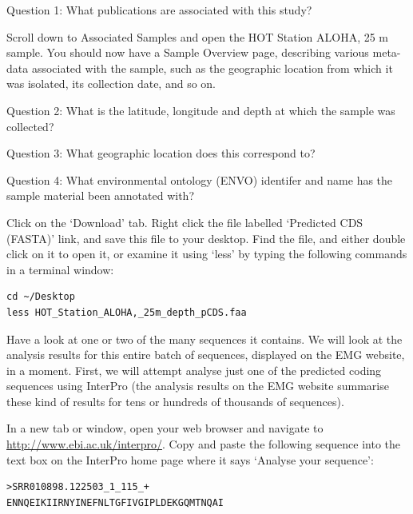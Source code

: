 \begin{questions}
Question 1: What publications are associated with this study?
\end{questions}

\begin{steps}
Scroll down to Associated Samples and open the HOT Station ALOHA, 25 m sample.
You should now have a Sample Overview page, describing various meta-data associated with the sample, such as the geographic location from which it was isolated, its collection date, and so on.
\end{steps}

\begin{questions}
Question 2: What is the latitude, longitude and depth at which the sample was collected?
\end{questions}

\begin{questions}
Question 3: What geographic location does this correspond to?
\end{questions}

\begin{questions}
Question 4: What environmental ontology (ENVO) identifer and name has the sample material been annotated with?
\end{questions}

\begin{steps}
Click on the ‘Download’ tab. Right click the file labelled ‘Predicted CDS (FASTA)’ link, and save this file to your desktop. Find the file, and either double click on it to open it, or examine it using ‘less’ by typing the following commands in a terminal window:
\begin{lstlisting}
cd ~/Desktop
less HOT_Station_ALOHA,_25m_depth_pCDS.faa
\end{lstlisting}
\end{steps}

Have a look at one or two of the many sequences it contains.
We will look at the analysis results for this entire batch of sequences, displayed on the EMG website, in a moment. First, we will attempt analyse just one of the predicted coding sequences using InterPro (the analysis results on the EMG website summarise these kind of results for tens or hundreds of thousands of sequences).

\begin{steps}
In a new tab or window, open your web browser and navigate to \url{http://www.ebi.ac.uk/interpro/}. Copy and paste the following sequence into the text box on the InterPro home page where it says ‘Analyse your sequence’:
\begin{lstlisting}
>SRR010898.122503_1_115_+
ENNQEIKIIRNYINEFNLTGFIVGIPLDEKGQMTNQAI
\end{lstlisting}
\end{steps}

